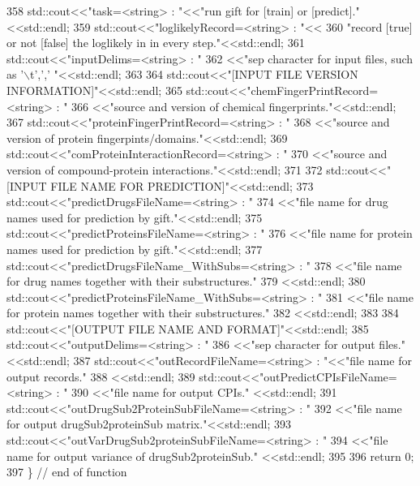 \begin{DoxyCode}
358     std::cout<<\textcolor{stringliteral}{"task=<string> : "}<<\textcolor{stringliteral}{"run gift for [train] or [predict]."}<<std::endl;
359     std::cout<<\textcolor{stringliteral}{"loglikelyRecord=<string> : "}<<
360       \textcolor{stringliteral}{"record [true] or not [false] the loglikely in in every step."}<<std::endl;
361     std::cout<<\textcolor{stringliteral}{"inputDelims=<string> : "}
362              <<\textcolor{stringliteral}{"sep character for input files, such as  '\(\backslash\)t',',' "}<<std::endl;
363 
364     std::cout<<\textcolor{stringliteral}{"[INPUT FILE VERSION INFORMATION]"}<<std::endl;
365     std::cout<<\textcolor{stringliteral}{"chemFingerPrintRecord=<string> : "}
366              <<\textcolor{stringliteral}{"source and version of chemical fingerprints."}<<std::endl;
367     std::cout<<\textcolor{stringliteral}{"proteinFingerPrintRecord=<string> : "}
368              <<\textcolor{stringliteral}{"source and version of protein fingerpints/domains."}<<std::endl;
369     std::cout<<\textcolor{stringliteral}{"comProteinInteractionRecord=<string> : "}
370              <<\textcolor{stringliteral}{"source and version of compound-protein interactions."}<<std::endl;
371 
372     std::cout<<\textcolor{stringliteral}{"[INPUT FILE NAME FOR PREDICTION]"}<<std::endl;
373     std::cout<<\textcolor{stringliteral}{"predictDrugsFileName=<string> : "}
374              <<\textcolor{stringliteral}{"file name for drug names used for prediction by gift."}<<std::endl;
375     std::cout<<\textcolor{stringliteral}{"predictProteinsFileName=<string> : "}
376              <<\textcolor{stringliteral}{"file name for protein names used for prediction by gift."}<<std::endl;
377     std::cout<<\textcolor{stringliteral}{"predictDrugsFileName\_WithSubs=<string> : "}
378              <<\textcolor{stringliteral}{"file name for drug names together with their substructures."}
379              <<std::endl;
380     std::cout<<\textcolor{stringliteral}{"predictProteinsFileName\_WithSubs=<string> : "}
381              <<\textcolor{stringliteral}{"file name for protein names together with their substructures."}
382              <<std::endl;
383 
384     std::cout<<\textcolor{stringliteral}{"[OUTPUT FILE NAME AND FORMAT]"}<<std::endl;
385     std::cout<<\textcolor{stringliteral}{"outputDelims=<string> : "}
386              <<\textcolor{stringliteral}{"sep character for output files."} <<std::endl;
387     std::cout<<\textcolor{stringliteral}{"outRecordFileName=<string> : "}<<\textcolor{stringliteral}{"file name for output records."}
388              <<std::endl;
389     std::cout<<\textcolor{stringliteral}{"outPredictCPIsFileName=<string> : "}
390              <<\textcolor{stringliteral}{"file name for output CPIs."} <<std::endl;
391     std::cout<<\textcolor{stringliteral}{"outDrugSub2ProteinSubFileName=<string> : "}
392              <<\textcolor{stringliteral}{"file name for output drugSub2proteinSub matrix."}<<std::endl;
393     std::cout<<\textcolor{stringliteral}{"outVarDrugSub2proteinSubFileName=<string> : "}
394              <<\textcolor{stringliteral}{"file name for output variance of drugSub2proteinSub."} <<std::endl;
395 
396     \textcolor{keywordflow}{return} 0;
397   \} \textcolor{comment}{// end of function}
\end{DoxyCode}
